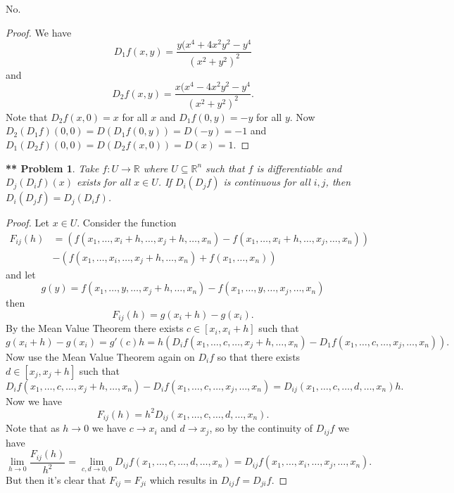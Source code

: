 \documentclass{article}
\newtheorem{**}{** Problem}
\begin{document}
\begin{flushleft}
No.
\begin{proof}
We have
\[
D_1f(x,y) = \frac{y(x^4 + 4x^2y^2 - y^4}{(x^2 + y^2)^2}
\]
and
\[
D_2f(x,y) = \frac{x(x^4 - 4x^2y^2 - y^4}{(x^2 + y^2)^2}.
\]
Note that $D_2f(x,0) = x$ for all $x$ and $D_1f(0,y) = -y$ for all $y$. Now $D_2(D_1f)(0,0) = D(D_1f(0,y)) = D(-y) = -1$ and $D_1(D_2f)(0,0) = D(D_2f(x,0)) = D(x) = 1$.
\end{proof}

\begin{**}
Take $f : U \rightarrow \mathbb{R}$ where $U \subseteq \mathbb{R}^n$ such that $f$ is differentiable and $D_j (D_i f)(x)$ exists for all $x \in U$. If $D_i (D_j f)$ is continuous for all $i,j$, then $D_i(D_jf) = D_j(D_if)$.
\end{**}
\begin{proof}
Let $x \in U$. Consider the function
\begin{align*}
F_{ij}(h)
&= (f(x_1, \dots , x_i+h, \dots , x_j+h, \dots , x_n) - f(x_1, \dots , x_i + h, \dots , x_j, \dots , x_n))\\
&- (f(x_1, \dots , x_i, \dots, x_j + h, \dots , x_n) + f(x_1, \dots , x_n))
\end{align*}
and let
\[
g(y) = f(x_1, \dots , y, \dots , x_j + h, \dots , x_n) - f(x_1, \dots , y, \dots , x_j, \dots , x_n)
\]
then
\[
F_{ij}(h) = g(x_i + h) - g(x_i).
\]
By the Mean Value Theorem there exists $c \in [x_i, x_i+h]$ such that
\[
g(x_i + h) - g(x_i) = g'(c) h = h (D_if(x_1, \dots , c, \dots, x_j + h, \dots , x_n) - D_1f(x_1, \dots , c, \dots , x_j, \dots , x_n)).
\]
Now use the Mean Value Theorem again on $D_if$ so that there exists $d \in [x_j, x_j+h]$ such that
\[
D_if(x_1, \dots , c, \dots, x_j + h, \dots , x_n) - D_if(x_1, \dots , c, \dots , x_j, \dots , x_n) = D_{ij} (x_1, \dots , c, \dots , d, \dots , x_n)h.
\]
Now we have
\[
F_{ij}(h) = h^2 D_{ij}(x_1, \dots , c, \dots , d, \dots , x_n).
\]
Note that as $h \rightarrow 0$ we have $c \rightarrow x_i$ and $d \rightarrow x_j$, so by the continuity of $D_{ij} f$ we have
\[
\lim_{h \rightarrow 0} \frac{F_{ij}(h)}{h^2} = \lim_{c,d \rightarrow 0,0} D_{ij}f(x_1, \dots , c, \dots , d, \dots , x_n) = D_{ij}f(x_1, \dots , x_i, \dots , x_j, \dots , x_n).
\]
But then it's clear that $F_{ij} = F_{ji}$ which results in $D_{ij}f = D_{ji}f$.
\end{proof}


\end{flushleft}
\end{document}
